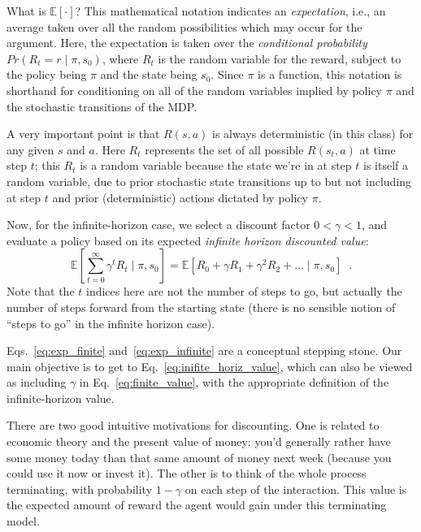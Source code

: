 \begin{examplebox}
  What is $\mathbb{E}\left[ \cdot \right ]$?  This mathematical
  notation indicates an {\em expectation}, i.e., an average
  taken over all the random possibilities which may occur for the
  argument.  Here, the expectation is taken over the {\em conditional
      probability} $Pr(R_t = r \mid \pi, s_0)$, where $R_t$ is the random
  variable for the reward, subject to the policy being $\pi$ and the
  state being $s_0$. Since $\pi$ is a function, this notation is
  shorthand for conditioning on all of the random variables implied by
  policy $\pi$ and the stochastic transitions of the MDP.

  \bigskip
  A very important point is that $R(s,a)$ is always deterministic (in this class) for
  any given $s$ and $a$. Here $R_t$ represents the set of all possible
  $R(s_t,a)$ at time step $t$; this $R_t$ is a random variable because
  the state we're in at step $t$ is itself a random variable, due to prior
  stochastic state transitions up to but not including at step $t$ and prior
  (deterministic) actions dictated by policy $\pi.$
\end{examplebox}

Now, for the infinite-horizon case, we select a discount factor $0 < \gamma < 1$,
and evaluate a policy based on its expected {\it{infinite horizon discounted value}}:
\begin{equation}
  \mathbb{E}\left[\sum_{t = 0}^{\infty}\gamma^tR_t \mid \pi, s_0\right]
  = \mathbb{E}\left[R_0  + \gamma R_1 + \gamma^2 R_2 + \ldots \mid \pi,  s_0\right] \;\;.
  \label{eq:exp_infinite}
\end{equation}
Note that the $t$ indices here are not the number of steps to go, but
actually the number of steps forward from the starting state (there is
no sensible notion  of ``steps to go'' in the infinite horizon case).

\begin{examplebox}
  Eqs.~\ref{eq:exp_finite} and~\ref{eq:exp_infinite} are a conceptual
  stepping stone. Our main objective is to get to
  Eq.~\ref{eq:inifite_horiz_value}, which can also be viewed
  as including $\gamma$ in Eq.~\ref{eq:finite_value}, with
  the appropriate definition of the infinite-horizon value.
\end{examplebox}

There are two good intuitive motivations for discounting.  One is
related to economic theory and the present value of money: you'd
generally rather have some money today than that same amount of money
next week (because you could use it now or invest it).  The other is
to think of the whole process terminating, with probability $1-\gamma$
on each step of the interaction.  This value is the expected amount of
reward the agent would gain under this terminating model.

